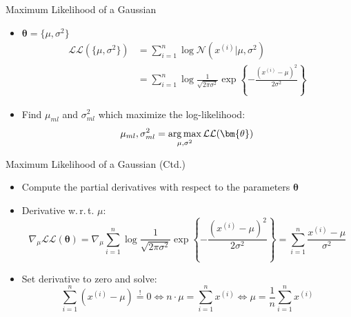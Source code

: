 \begin{frame}{Maximum Likelihood of a Gaussian}{}
	\begin{itemize}
		\item $\bm{\theta} = \{ \mu, \sigma^2 \}$
		\begin{align}
			\mathcal{L}\mathcal{L}(\{ \mu, \sigma^2 \})
				&= \sum_{i=1}^n \log \mathcal{N}(x^{(i)} \vert \mu, \sigma^2) \\
				&= \sum_{i=1}^n \log \frac{1}{\sqrt{2 \pi \sigma^2}} \exp\left\{ -\frac{(x^{(i)} - \mu)^2}{2 \sigma^2} \right\}
		\end{align}
		\item Find $\mu_{ml}$ and $\sigma_{ml}^2$ which maximize the log-likelihood:
		\begin{equation*}
			\mu_{ml}, \sigma_{ml}^2 = \argmax_{\mu, \sigma^2} \mathcal{L}\mathcal{L}(\bm{\theta})
		\end{equation*}
	\end{itemize}
\end{frame}


\begin{frame}{Maximum Likelihood of a Gaussian (Ctd.)}{}
	\begin{itemize}
		\item Compute the partial derivatives with respect to the parameters $\bm{\theta}$
		\item Derivative w.\,r.\,t. $\mu$:
		\begin{equation*}
			\nabla_{\mu}\mathcal{L}\mathcal{L}(\bm{\theta})
				= \nabla_{\mu} \sum_{i=1}^n \log \frac{1}{\sqrt{2 \pi \sigma^2}} \exp\left\{ -\frac{(x^{(i)} - \mu)^2}{2 \sigma^2} \right\}
				= \sum_{i=1}^n \frac{x^{(i)} - \mu}{\sigma^2}
		\end{equation*}
		\item Set derivative to zero and solve:
		\begin{equation*}
			\sum_{i=1}^n (x^{(i)} - \mu) \overset{!}{=} 0
				\Leftrightarrow n \cdot \mu = \sum_{i=1}^n x^{(i)}
				\Leftrightarrow \mu = \frac{1}{n} \sum_{i=1}^n x^{(i)}
 		\end{equation*}
	\end{itemize}
\end{frame}


